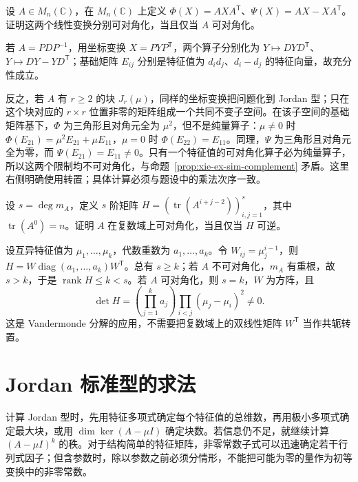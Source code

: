 \begin{example}
设 $A\in M_n(\mathbb C)$，在 $M_n(\mathbb C)$ 上定义 $\Phi(X)=AXA^{\mathsf T}$、$\Psi(X)=AX-XA^{\mathsf T}$。证明这两个线性变换分别可对角化，当且仅当 $A$ 可对角化。
\end{example}
\begin{solve}
若 $A=PDP^{-1}$，用坐标变换 $X=PYP^{\mathsf T}$，两个算子分别化为 $Y\mapsto DYD^{\mathsf T}$、$Y\mapsto DY-YD^{\mathsf T}$；基础矩阵 $E_{ij}$ 分别是特征值为 $d_id_j$、$d_i-d_j$ 的特征向量，故充分性成立。

反之，若 $A$ 有 $r\geq2$ 的块 $J_r(\mu)$，同样的坐标变换把问题化到 Jordan 型；只在这个块对应的 $r\times r$ 位置非零的矩阵组成一个共同不变子空间。在该子空间的基础矩阵基下，$\Phi$ 为三角形且对角元全为 $\mu^2$，但不是纯量算子：$\mu\ne0$ 时 $\Phi(E_{21})=\mu^2E_{21}+\mu E_{11}$，$\mu=0$ 时 $\Phi(E_{22})=E_{11}$。同理，$\Psi$ 为三角形且对角元全为零，而 $\Psi(E_{21})=E_{11}\ne0$。只有一个特征值的可对角化算子必为纯量算子，所以这两个限制均不可对角化，与命题~\ref{prop:xie-ex-sim-complement} 矛盾。这里右侧明确使用转置；具体计算必须与题设中的乘法次序一致。
\end{solve}

\begin{example}
设 $s=\deg m_A$，定义 $s$ 阶矩阵 $H=(\operatorname{tr}(A^{i+j-2}))_{i,j=1}^{s}$，其中 $\operatorname{tr}(A^0)=n$。证明 $A$ 在复数域上可对角化，当且仅当 $H$ 可逆。
\end{example}
\begin{solve}
设互异特征值为 $\mu_1,\ldots,\mu_k$，代数重数为 $a_1,\ldots,a_k$。令 $W_{ij}=\mu_j^{i-1}$，则 $H=W\operatorname{diag}(a_1,\ldots,a_k)W^{\mathsf T}$。总有 $s\geq k$；若 $A$ 不可对角化，$m_A$ 有重根，故 $s>k$，于是 $\operatorname{rank}H\leq k<s$。若 $A$ 可对角化，则 $s=k$，$W$ 为方阵，且
\[
 \det H=\left(\prod_{j=1}^{k}a_j\right)
 \prod_{i<j}(\mu_j-\mu_i)^2\ne0.
\]
这是 Vandermonde 分解的应用，不需要把复数域上的双线性矩阵 $W^{\mathsf T}$ 当作共轭转置。
\end{solve}

\section{Jordan 标准型的求法}
\label{sec:xie-ex-sim-jordan-computation}

计算 Jordan 型时，先用特征多项式确定每个特征值的总维数，再用极小多项式确定最大块，或用 $\dim\ker(A-\mu I)$ 确定块数。若信息仍不足，就继续计算 $(A-\mu I)^k$ 的秩。对于结构简单的特征矩阵，非零常数子式可以迅速确定若干行列式因子；但含参数时，除以参数之前必须分情形，不能把可能为零的量作为初等变换中的非零常数。

